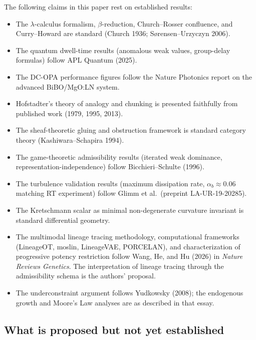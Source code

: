 \documentclass[12pt, a4paper]{article}
\theoremstyle{plain}
\theoremstyle{definition}
\theoremstyle{remark}
\begin{document}
The following claims in this paper rest on established results:
\begin{itemize}
  \item The $\lambda$-calculus formalism, $\beta$-reduction,
        Church--Rosser confluence, and Curry--Howard are standard
        (Church 1936; Sørensen--Urzyczyn 2006).
  \item The quantum dwell-time results (anomalous weak values,
        group-delay formulas) follow APL Quantum (2025).
  \item The DC-OPA performance figures follow the Nature Photonics
        report on the advanced BiBO/MgO:LN system.
  \item Hofstadter's theory of analogy and chunking is presented
        faithfully from published work (1979, 1995, 2013).
  \item The sheaf-theoretic gluing and obstruction framework is
        standard category theory (Kashiwara--Schapira 1994).
  \item The game-theoretic admissibility results (iterated weak
        dominance, representation-independence) follow
        Bicchieri--Schulte (1996).
  \item The turbulence validation results (maximum dissipation rate,
        $\alpha_b \approx 0.06$ matching RT experiment) follow
        Glimm et al.\ (preprint LA-UR-19-20285).
  \item The Kretschmann scalar as minimal non-degenerate curvature
        invariant is standard differential geometry.
  \item The multimodal lineage tracing methodology, computational
        frameworks (LineageOT, moslin, LineageVAE, PORCELAN), and
        characterization of progressive potency restriction follow
        Wang, He, and Hu (2026) in \textit{Nature Reviews Genetics}.
        The interpretation of lineage tracing through the admissibility
        schema is the authors' proposal.
  \item The underconstraint argument follows Yudkowsky (2008);
        the endogenous growth and Moore's Law analyses are as
        described in that essay.
\end{itemize}

\subsection{What is proposed but not yet established}
\end{document}
